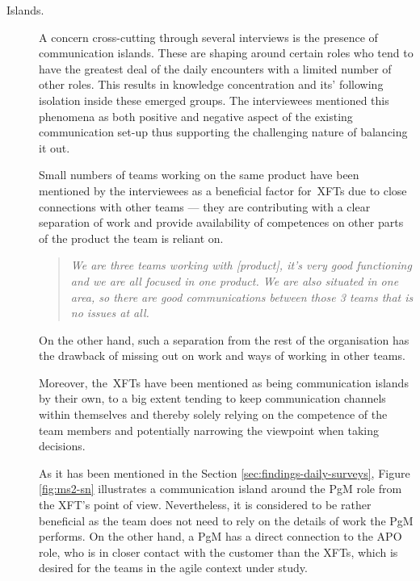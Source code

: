 \begin{description}
   \item[Islands.] A concern cross-cutting through several interviews is the presence of communication islands. These are shaping around certain roles who tend to have the greatest deal of the daily encounters with a limited number of other roles. This results in knowledge concentration and its' following isolation inside these emerged groups. The interviewees mentioned this phenomena as both positive and negative aspect of the existing communication set-up thus supporting the challenging nature of balancing it out.
   
Small numbers of teams working on the same product have been mentioned by the interviewees as a beneficial factor for~\acp{XFT} due to close connections with other teams — they are contributing with a clear separation of work and provide availability of competences on other parts of the product the team is reliant on.

      \begin{quote}\itshape We are three teams working with [product], it's very good functioning and we are all focused in one product. We are also situated in one area, so there are good communications between those 3 teams that is no issues at all.
      \end{quote}

   On the other hand, such a separation from the rest of the organisation has the drawback of missing out on work and ways of working in other teams.


   Moreover, the~\acp{XFT} have been mentioned as being communication islands by their own, to a big extent tending to keep communication channels within themselves and thereby solely relying on the competence of the team members and potentially narrowing the viewpoint when taking decisions.

      
As it has been mentioned in the Section \ref{sec:findings-daily-surveys}, Figure \ref{fig:ms2-sn} illustrates a communication island around the \ac{PgM} role from the \ac{XFT}'s point of view. Nevertheless, it is considered to be rather beneficial as the team does not need to rely on the details of work the \ac{PgM} performs. On the other hand, a \ac{PgM} has a direct connection to the \ac{APO} role, who is in closer contact with the customer than the \acp{XFT}, which is desired for the teams in the agile context under study.


\end{description}
